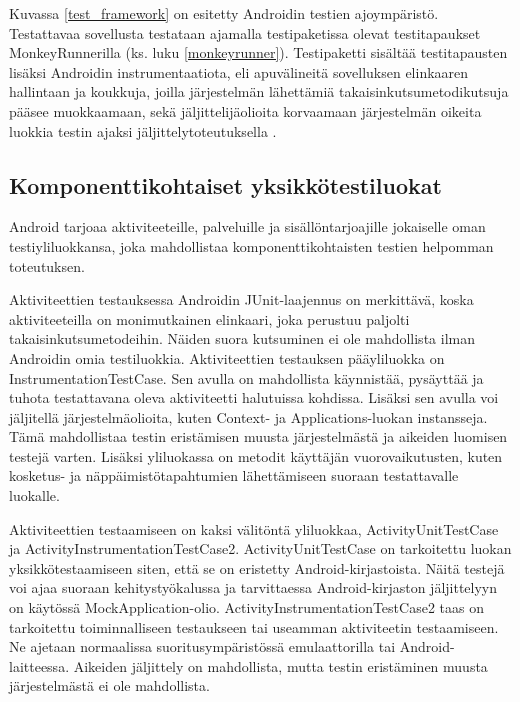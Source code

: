 Kuvassa \ref{test_framework} on esitetty Androidin testien ajoympäristö. Testattavaa sovellusta testataan ajamalla testipaketissa olevat testitapaukset MonkeyRunnerilla (ks. luku \ref{monkeyrunner}). Testipaketti sisältää testitapausten lisäksi Androidin instrumentaatiota, eli apuvälineitä sovelluksen elinkaaren hallintaan ja koukkuja, joilla järjestelmän lähettämiä takaisinkutsumetodikutsuja pääsee muokkaamaan, sekä jäljittelijäolioita korvaamaan järjestelmän oikeita luokkia testin ajaksi jäljittelytoteutuksella \cite{android}.

\subsection{Komponenttikohtaiset yksikkötestiluokat}

Android tarjoaa aktiviteeteille, palveluille ja sisällöntarjoajille jokaiselle oman testiyliluokkansa, joka mahdollistaa komponenttikohtaisten testien helpomman toteutuksen.

Aktiviteettien testauksessa Androidin JUnit-laajennus on merkittävä, koska aktiviteeteilla on monimutkainen elinkaari, joka perustuu paljolti takaisinkutsumetodeihin. Näiden suora kutsuminen ei ole mahdollista ilman Androidin omia testiluokkia. Aktiviteettien testauksen pääyliluokka on InstrumentationTestCase. Sen avulla on mahdollista käynnistää, pysäyttää ja tuhota testattavana oleva aktiviteetti halutuissa kohdissa. Lisäksi sen avulla voi jäljitellä järjestelmäolioita, kuten Context- ja Applications-luokan instansseja. Tämä mahdollistaa testin eristämisen muusta järjestelmästä ja aikeiden luomisen testejä varten. Lisäksi yliluokassa on metodit käyttäjän vuorovaikutusten, kuten kosketus- ja näppäimistötapahtumien lähettämiseen suoraan testattavalle luokalle.

Aktiviteettien testaamiseen on kaksi välitöntä yliluokkaa, ActivityUnitTestCase ja ActivityInstrumentationTestCase2. ActivityUnitTestCase on tarkoitettu luokan yksikkötestaamiseen siten, että se on eristetty Android-kirjastoista. Näitä testejä voi ajaa suoraan kehitystyökalussa ja tarvittaessa Android-kirjaston jäljittelyyn on käytössä MockApplication-olio. ActivityInstrumentationTestCase2 taas on tarkoitettu toiminnalliseen testaukseen tai useamman aktiviteetin testaamiseen. Ne ajetaan normaalissa suoritusympäristössä emulaattorilla tai Android-laitteessa. Aikeiden jäljittely on mahdollista, mutta testin eristäminen muusta järjestelmästä ei ole mahdollista.

